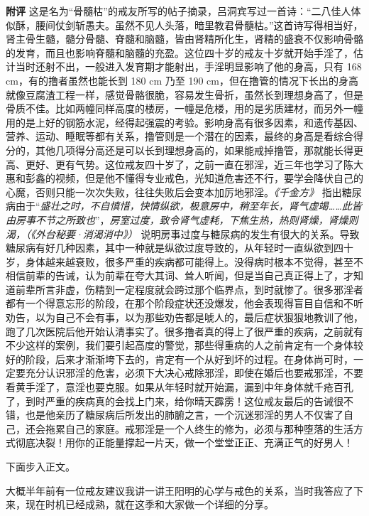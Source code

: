 \begin{case}
    \textbf{附评} 这是名为“骨髓枯”的戒友所写的帖子摘录，吕洞宾写过一首诗：“二八佳人体似酥，腰间仗剑斩愚夫。虽然不见人头落，暗里教君骨髓枯。”这首诗写得相当好，肾主骨生髓，髓分骨髓、脊髓和脑髓，皆由肾精所化生，肾精的盛衰不仅影响骨骼的发育，而且也影响脊髓和脑髓的充盈。这位四十岁的戒友十岁就开始手淫了，估计当时还射不出，一般进入发育期才能射出，手淫明显影响了他的身高，只有 168 \unit{\cm}，有的撸者虽然也能长到 180 \unit{\cm} 乃至 190 \unit{\cm}，但在撸管的情况下长出的身高就像豆腐渣工程一样，感觉骨骼很脆，容易发生骨折，虽然长到理想身高了，但是骨质不佳。比如两幢同样高度的楼房，一幢是危楼，用的是劣质建材，而另外一幢用的是上好的钢筋水泥，经得起强震的考验。影响身高有很多因素，和遗传基因、营养、运动、睡眠等都有关系，撸管则是一个潜在的因素，最终的身高是看综合得分的，其他几项得分高还是可以长到理想身高的，如果能戒掉撸管，那就能长得更高、更好、更有气势。这位戒友四十岁了，之前一直在邪淫，近三年也学习了陈大惠和彭鑫的视频，但是他不懂得专业戒色，光知道危害还不行，要学会降伏自己的心魔，否则只能一次次失败，往往失败后会变本加厉地邪淫。\textit{《千金方》} 指出糖尿病由于“\textit{盛壮之时，不自慎惜，快情纵欲，极意房中，稍至年长，肾气虚竭……此皆由房事不节之所致也}”，\textit{房室过度，致令肾气虚耗，下焦生热，热则肾燥，肾燥则渴，（《外台秘要·消渴消中》）} 说明房事过度与糖尿病的发生有很大的关系。导致糖尿病有好几种因素，其中一种就是纵欲过度导致的，从年轻时一直纵欲到四十岁，身体越来越衰败，很多严重的疾病都可能得上。没得病时根本不觉得，甚至不相信前辈的告诫，认为前辈在夸大其词、耸人听闻，但是当自己真正得上了，才知道前辈所言非虚，伤精到一定程度就会跨过那个临界点，到时就惨了。很多邪淫者都有一个得意忘形的阶段，在那个阶段症状还没爆发，他会表现得盲目自信和不听劝告，以为自己不会有事，以为那些劝告都是唬人的，最后症状狠狠地教训了他，跑了几次医院后他开始认清事实了。很多撸者真的得上了很严重的疾病，之前就有不少这样的案例，我们要引起高度的警觉，那些得重病的人之前肯定有一个身体较好的阶段，后来才渐渐垮下去的，肯定有一个从好到坏的过程。在身体尚可时，一定要充分认识邪淫的危害，必须下大决心戒除邪淫，即使在婚后也要戒邪淫，不要看黄手淫了，意淫也要克服。如果从年轻时就开始漏，漏到中年身体就千疮百孔了，到时严重的疾病真的会找上门来，给你晴天霹雳！这位戒友最后的告诫很不错，也是他亲历了糖尿病后所发出的肺腑之言，一个沉迷邪淫的男人不仅害了自己，还会拖累自己的家庭。戒邪淫是一个人终生的修为，必须与那种堕落的生活方式彻底决裂！用你的正能量撑起一片天，做一个堂堂正正、充满正气的好男人！
\end{case}

下面步入正文。

大概半年前有一位戒友建议我讲一讲王阳明的心学与戒色的关系，当时我答应了下来，现在时机已经成熟，就在这季和大家做一个详细的分享。

